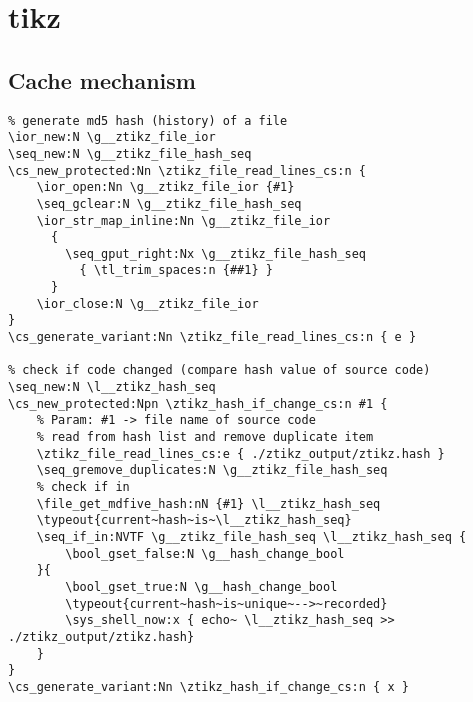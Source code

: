 \section{tikz}
\subsection{Cache mechanism}
\begin{verbatim}
% generate md5 hash (history) of a file
\ior_new:N \g__ztikz_file_ior
\seq_new:N \g__ztikz_file_hash_seq
\cs_new_protected:Nn \ztikz_file_read_lines_cs:n {
    \ior_open:Nn \g__ztikz_file_ior {#1}
    \seq_gclear:N \g__ztikz_file_hash_seq
    \ior_str_map_inline:Nn \g__ztikz_file_ior
      {
        \seq_gput_right:Nx \g__ztikz_file_hash_seq
          { \tl_trim_spaces:n {##1} }
      }
    \ior_close:N \g__ztikz_file_ior
}
\cs_generate_variant:Nn \ztikz_file_read_lines_cs:n { e }

% check if code changed (compare hash value of source code)
\seq_new:N \l__ztikz_hash_seq
\cs_new_protected:Npn \ztikz_hash_if_change_cs:n #1 {
    % Param: #1 -> file name of source code
    % read from hash list and remove duplicate item
    \ztikz_file_read_lines_cs:e { ./ztikz_output/ztikz.hash }
    \seq_gremove_duplicates:N \g__ztikz_file_hash_seq
    % check if in
    \file_get_mdfive_hash:nN {#1} \l__ztikz_hash_seq
    \typeout{current~hash~is~\l__ztikz_hash_seq}
    \seq_if_in:NVTF \g__ztikz_file_hash_seq \l__ztikz_hash_seq {
        \bool_gset_false:N \g__hash_change_bool
    }{
        \bool_gset_true:N \g__hash_change_bool
        \typeout{current~hash~is~unique~-->~recorded}
        \sys_shell_now:x { echo~ \l__ztikz_hash_seq >> ./ztikz_output/ztikz.hash}
    }
}
\cs_generate_variant:Nn \ztikz_hash_if_change_cs:n { x }
\end{verbatim}

